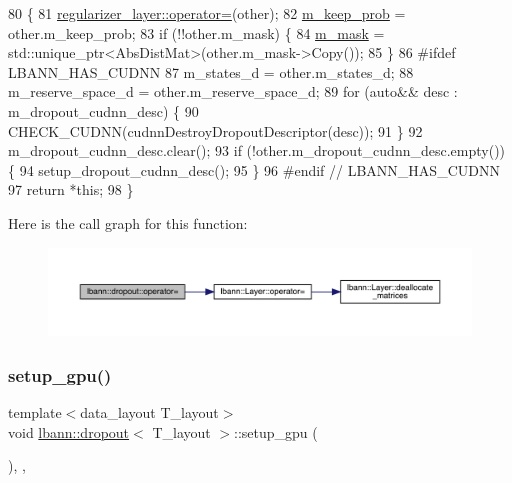 \begin{DoxyCode}
80                                            \{
81     \hyperlink{classlbann_1_1Layer_a00d8acde68fda2f38c4a39ef8c89234a}{regularizer\_layer::operator=}(other);
82     \hyperlink{classlbann_1_1dropout_aa06cbee70f3426b589990889b8ac8872}{m\_keep\_prob} = other.m\_keep\_prob;
83     \textcolor{keywordflow}{if} (!!other.m\_mask) \{
84       \hyperlink{classlbann_1_1dropout_ad7d359957d41adcb64e6e3a2d4ad278d}{m\_mask} = std::unique\_ptr<AbsDistMat>(other.m\_mask->Copy());
85     \}
86 \textcolor{preprocessor}{  #ifdef LBANN\_HAS\_CUDNN}
87     m\_states\_d = other.m\_states\_d;
88     m\_reserve\_space\_d = other.m\_reserve\_space\_d;
89     \textcolor{keywordflow}{for} (\textcolor{keyword}{auto}&& desc : m\_dropout\_cudnn\_desc) \{
90       CHECK\_CUDNN(cudnnDestroyDropoutDescriptor(desc));
91     \}
92     m\_dropout\_cudnn\_desc.clear();
93     \textcolor{keywordflow}{if} (!other.m\_dropout\_cudnn\_desc.empty()) \{
94       setup\_dropout\_cudnn\_desc();
95     \}
96 \textcolor{preprocessor}{  #endif // LBANN\_HAS\_CUDNN}
97     \textcolor{keywordflow}{return} *\textcolor{keyword}{this};
98   \}
\end{DoxyCode}
Here is the call graph for this function\+:\nopagebreak
\begin{figure}[H]
\begin{center}
\leavevmode
\includegraphics[width=350pt]{classlbann_1_1dropout_a0243b0bc3c2a4239a5ba6d64e6566a15_cgraph}
\end{center}
\end{figure}
\mbox{\label{classlbann_1_1dropout_abaa3d0c6d99200b186d0a55201f77b6a}} 
\subsubsection{\texorpdfstring{setup\+\_\+gpu()}{setup\_gpu()}}
{\footnotesize\ttfamily template$<$data\+\_\+layout T\+\_\+layout$>$ \\
void \hyperlink{classlbann_1_1dropout}{lbann\+::dropout}$<$ T\+\_\+layout $>$\+::setup\+\_\+gpu (\begin{DoxyParamCaption}{ }\end{DoxyParamCaption})\hspace{0.3cm}{\ttfamily [inline]}, {\ttfamily [override]}, {\ttfamily [virtual]}}

